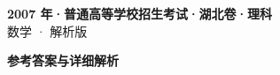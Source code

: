 \documentclass[zihao=-4, a4paper]{ctexart}
\begin{document}
\begin{center}
  {\Large\bfseries 2007 年·普通高等学校招生考试·湖北卷·理科}\\[4pt]
  {\large 数学 · 解析版}
\end{center}
\medskip
{}

\clearpage
{}
\begin{center}{\Large\bfseries 参考答案与详细解析}\end{center}
\medskip

\end{document}
